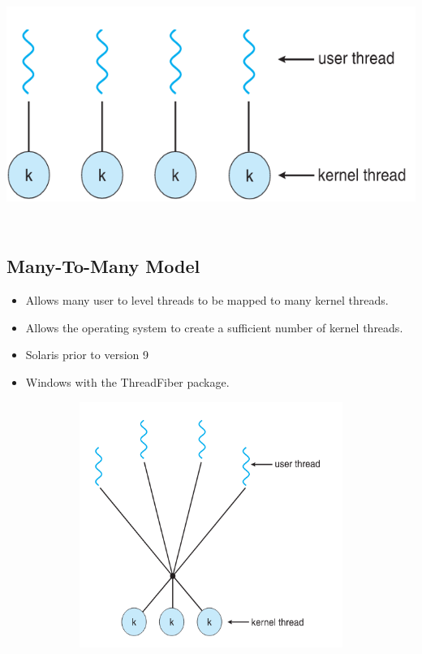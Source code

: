 \documentclass[12pt]{extarticle}
\begin{document}
\begin{center}

    \includegraphics[width=15cm, height=8cm]{one-to-one}
     
\end{center} 

\newpage

\subsection{Many-To-Many Model}

\begin{itemize}
    \item Allows many user to level threads to be mapped to many kernel threads.
    \item Allows the operating system to create a sufficient number of kernel threads.
    \item Solaris prior to version 9
    \item Windows with the ThreadFiber package.
\end{itemize}

\begin{center}

    \includegraphics[width=15cm, height=8cm]{many-to-many}
     
\end{center} 
\end{document}
